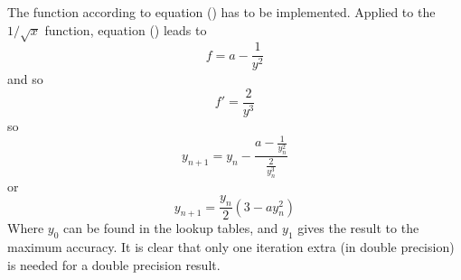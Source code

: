 The function according to equation () has to be implemented. 
Applied to the $1/\sqrt{x}$ function, equation 
() leads to
\begin{equation}
f = a - \frac{1}{y^{2}}
\end{equation}
and so
\begin{equation}
f' = \frac{2}{y^{3}}
\end{equation}
so
\begin{equation}
y_{n+1} = y_{n} - \frac{ a - \frac{1}{y^{2}_{n}} }{ \frac{2}{y^{3}_{n}} }
\end{equation}
or
\begin{equation}
y_{n+1} = \frac{y_{n}}{2} (3 - a y^{2}_{n})
\end{equation}
Where $y_{0}$ can be found in the lookup tables, and $y_{1}$ gives the result
to the maximum accuracy. 
It is clear that only one iteration extra (in double 
precision) is needed for a double precision result.
